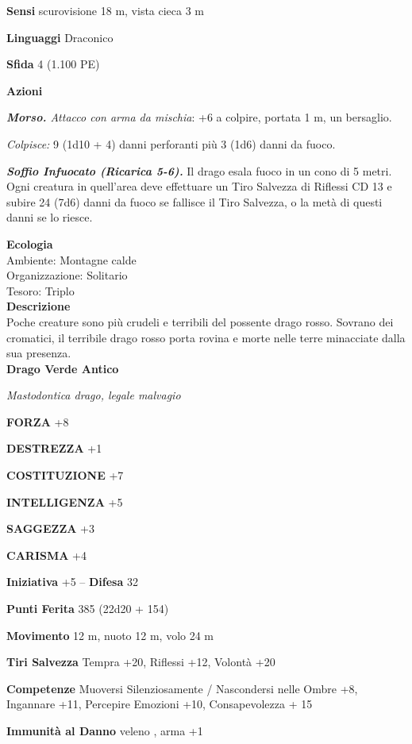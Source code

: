 \begin{multicols}{2}
\textbf{Sensi} scurovisione 18 m, vista cieca 3 m

\textbf{Linguaggi} Draconico

\textbf{Sfida} 4 (1.100 PE)

\textbf{Azioni}

\emph{\textbf{Morso.} Attacco con arma da mischia}: +6 a colpire, portata 1 m, un bersaglio.

\emph{Colpisce:} 9 (1d10 + 4) danni perforanti più 3 (1d6) danni da fuoco.

\emph{\textbf{Soffio Infuocato (Ricarica 5-6).}} Il drago esala fuoco in un cono di 5 metri. Ogni creatura in quell'area deve effettuare un Tiro Salvezza di Riflessi CD 13 e subire 24 (7d6) danni da fuoco se fallisce il Tiro Salvezza, o la metà di questi danni se lo riesce.

\textbf{Ecologia}\\
Ambiente: Montagne calde\\
Organizzazione: Solitario\\
Tesoro: Triplo\\
\textbf{Descrizione}\\
Poche creature sono più crudeli e terribili del possente drago rosso. Sovrano dei cromatici, il terribile drago rosso porta rovina e morte nelle terre minacciate dalla sua presenza.\\


\medskip{}\textbf{Drago Verde Antico}

\emph{Mastodontica drago, legale malvagio}

\textbf{FORZA} +8

\textbf{DESTREZZA} +1

\textbf{COSTITUZIONE} +7

\textbf{INTELLIGENZA} +5

\textbf{SAGGEZZA} +3

\textbf{CARISMA} +4

\textbf{Iniziativa} +5 -- \textbf{Difesa} 32

\textbf{Punti Ferita} 385 (22d20 + 154) 

\textbf{Movimento} 12 m, nuoto 12 m, volo 24 m

\textbf{Tiri Salvezza} Tempra +20, Riflessi +12, Volontà +20

\textbf{Competenze} Muoversi Silenziosamente / Nascondersi nelle Ombre +8, Ingannare +11, Percepire Emozioni +10, Consapevolezza + 15

\textbf{Immunità al Danno} veleno , arma +1


\end{multicols}
